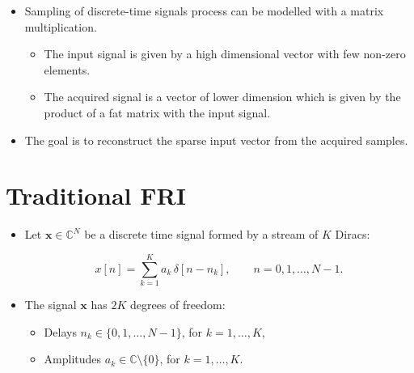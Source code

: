 \documentclass[a0,portrait]{a0poster}
\begin{document}
\begin{multicols}{2}
\begin{itemize}
\item Sampling of discrete-time signals process can be modelled with a matrix multiplication. 
\begin{itemize}
\item The input signal is given by a high dimensional vector with few non-zero elements. 
\item The acquired signal is a vector of lower dimension which is given 
by the product of a fat matrix with the input signal. 
\end{itemize}


\item The goal is to reconstruct the sparse input vector from the acquired samples. 

\end{itemize}


\color{Navy} %

\section*{Traditional FRI}

\begin{itemize}

\item Let $\bm{x} \in \mathbb{C}^N$ be a discrete time signal formed by a stream of $K$ Diracs:

\begin{equation}
x[n] = \sum_{k=1}^K a_k \, \delta [n - n_k], \qquad n = 0, 1, \ldots, N-1.
\label{eq:sparse_x}
\end{equation}


\item The signal $\bm{x}$ has $2K$ degrees of freedom: 
\begin{itemize}
\item Delays $n_k \in \lbrace 0, 1, \ldots, N-1\rbrace$, for $k=1,\ldots,K$,
\item Amplitudes $a_k \in \mathbb{C} \setminus \{0\}$, for $k=1,\ldots,K$.
\end{itemize}


\end{itemize}
\end{multicols}
\end{document}

